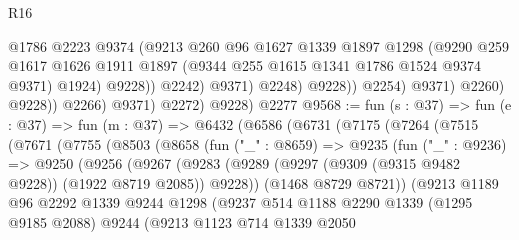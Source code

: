 \begin{lexlean}{R16}
\begin{coremodule}
                                  @1786
                                  @2223
                                  @9374
                                  (@9213
                                    @260
                                    @96
                                    @1627
                                    @1339
                                    @1897
                                    @1298
                                    (@9290
                                      @259
                                      @1617
                                      @1626
                                      @1911
                                      @1897
                                      (@9344 @255 @1615 @1341 @1786 @1524 @9374 @9371)
                                      @1924)
                                    @9228))
                                @2242)
                              @9371)
                            @2248)
                          @9228))
                      @2254)
                    @9371)
                  @2260)
                @9228))
            @2266)
          @9371)
        @2272)
      @9228)
    @2277
@9568 := fun (s : @37) =>
  fun (e : @37) =>
  fun (m : @37) =>
  @6432
    (@6586
      (@6731
        (@7175
          (@7264
            (@7515
              (@7671
                (@7755
                  (@8503
                    (@8658
                      (fun ("_" : @8659) =>
                      @9235
                        (fun ("_" : @9236) =>
                        @9250
                          (@9256
                            (@9267
                              (@9283
                                (@9289
                                  (@9297 (@9309 (@9315 @9482 @9228)) (@1922 @8719 @2085))
                                  @9228))
                              (@1468 @8729 @8721))
                            (@9213
                              @1189
                              @96
                              @2292
                              @1339
                              @9244
                              @1298
                              (@9237
                                @514
                                @1188
                                @2290
                                @1339
                                (@1295 @9185 @2088)
                                @9244
                                (@9213
                                  @1123
                                  @714
                                  @1339
                                  @2050

\end{coremodule}
\end{lexlean}

